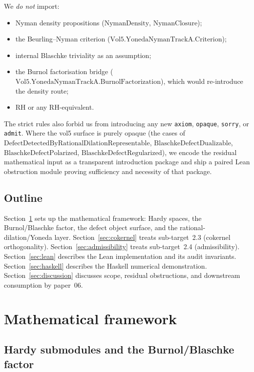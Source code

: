 \documentclass[12pt]{article}
\theoremstyle{definition}
\theoremstyle{remark}
\begin{document}
\noindent We \emph{do not} import:
\begin{itemize}
  \item Nyman density propositions ($\mathrm{NymanDensity}$, $\mathrm{NymanClosure}$);
  \item the Beurling--Nyman criterion ($\mathrm{Vol5.YonedaNymanTrackA.Criterion}$);
  \item internal Blaschke triviality as an assumption;
  \item the Burnol factorisation bridge ($\mathrm{Vol5.YonedaNymanTrackA.BurnolFactorization}$), which would re-introduce the density route;
  \item RH or any RH-equivalent.
\end{itemize}
The strict rules also forbid us from introducing any new \texttt{axiom}, \texttt{opaque}, \texttt{sorry}, or \texttt{admit}. Where the vol5 surface is purely opaque (the cases of $\mathrm{DefectDetectedByRationalDilationRepresentable}$, $\mathrm{BlaschkeDefectDualizable}$, $\mathrm{BlaschkeDefectPolarized}$, $\mathrm{BlaschkeDefectRegularized}$), we encode the residual mathematical input as a transparent introduction package and ship a paired Lean obstruction module proving sufficiency and necessity of that package.

\subsection{Outline}

Section~\ref{sec:framework} sets up the mathematical framework: Hardy spaces, the Burnol/Blaschke factor, the defect object surface, and the rational-dilation/Yoneda layer. Section~\ref{sec:cokernel} treats sub-target~2.3 (cokernel orthogonality). Section~\ref{sec:admissibility} treats sub-target~2.4 (admissibility). Section~\ref{sec:lean} describes the Lean implementation and its audit invariants. Section~\ref{sec:haskell} describes the Haskell numerical demonstration. Section~\ref{sec:discussion} discusses scope, residual obstructions, and downstream consumption by paper~06.

\section{Mathematical framework}\label{sec:framework}

\subsection{Hardy submodules and the Burnol/Blaschke factor}
\end{document}
